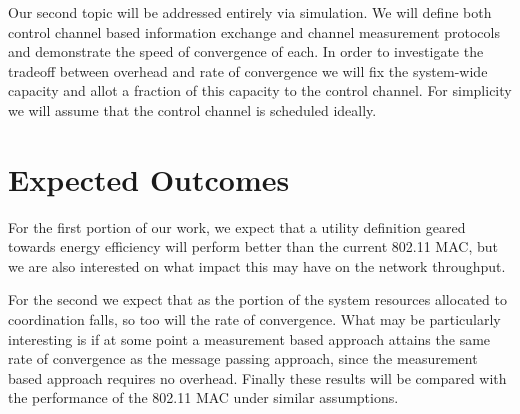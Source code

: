 \documentclass[conference]{IEEEtran}
\begin{document}
Our second topic will be addressed entirely via simulation. We will define both control channel based information exchange and channel measurement protocols and demonstrate the speed of convergence of each. In order to investigate the tradeoff between overhead and rate of convergence we will fix the system-wide capacity and allot a fraction of this capacity to the control channel. For simplicity we will assume that the control channel is scheduled ideally.

\section{Expected Outcomes}
For the first portion of our work, we expect that a utility definition geared towards energy efficiency will perform better than the current 802.11 MAC, but we are also interested on what impact this may have on the network throughput. 

For the second we expect that as the portion of the system resources allocated to coordination falls, so too will the rate of convergence. What may be particularly interesting is if at some point a measurement based approach attains the same rate of convergence as the message passing approach, since the measurement based approach requires no overhead. Finally these results will be compared with the performance of the 802.11 MAC under similar assumptions.



\end{document}
